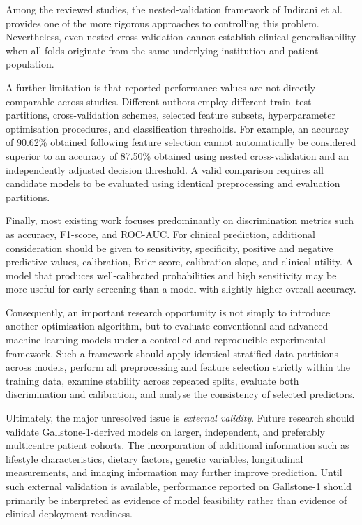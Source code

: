 Among the reviewed studies, the nested-validation framework of Indirani et al.~\cite{indirani2026ensemble} provides one of the more rigorous approaches to controlling this problem. Nevertheless, even nested cross-validation cannot establish clinical generalisability when all folds originate from the same underlying institution and patient population.

A further limitation is that reported performance values are not directly comparable across studies. Different authors employ different train--test partitions, cross-validation schemes, selected feature subsets, hyperparameter optimisation procedures, and classification thresholds. For example, an accuracy of 90.62\% obtained following feature selection cannot automatically be considered superior to an accuracy of 87.50\% obtained using nested cross-validation and an independently adjusted decision threshold. A valid comparison requires all candidate models to be evaluated using identical preprocessing and evaluation partitions.

Finally, most existing work focuses predominantly on discrimination metrics such as accuracy, F1-score, and ROC-AUC. For clinical prediction, additional consideration should be given to sensitivity, specificity, positive and negative predictive values, calibration, Brier score, calibration slope, and clinical utility. A model that produces well-calibrated probabilities and high sensitivity may be more useful for early screening than a model with slightly higher overall accuracy.

Consequently, an important research opportunity is not simply to introduce another optimisation algorithm, but to evaluate conventional and advanced machine-learning models under a controlled and reproducible experimental framework. Such a framework should apply identical stratified data partitions across models, perform all preprocessing and feature selection strictly within the training data, examine stability across repeated splits, evaluate both discrimination and calibration, and analyse the consistency of selected predictors.

Ultimately, the major unresolved issue is \textit{external validity}. Future research should validate Gallstone-1-derived models on larger, independent, and preferably multicentre patient cohorts. The incorporation of additional information such as lifestyle characteristics, dietary factors, genetic variables, longitudinal measurements, and imaging information may further improve prediction. Until such external validation is available, performance reported on Gallstone-1 should primarily be interpreted as evidence of model feasibility rather than evidence of clinical deployment readiness.
